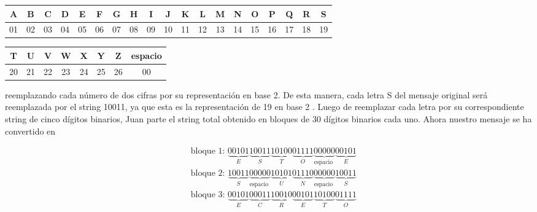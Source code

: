\documentclass[10pt]{article}
\begin{document}
\begin{center}
\begin{tabular}{|c|c|c|c|c|c|c|c|c|c|c|c|c|c|c|c|c|c|c|}
\hline
A & B & C & D & E & F & G & H & I & J & K & L & M & N & O & P & Q & R & S \\
\hline
01 & 02 & 03 & 04 & 05 & 06 & 07 & 08 & 09 & 10 & 11 & 12 & 13 & 14 & 15 & 16 & 17 & 18 & 19 \\
\hline
\end{tabular}
\end{center}

\begin{center}
\begin{tabular}{|c|c|c|c|c|c|c|c|}
\hline
T & U & V & W & X & Y & Z & espacio \\
\hline
20 & 21 & 22 & 23 & 24 & 25 & 26 & 00 \\
\hline
\end{tabular}
\end{center}

reemplazando cada número de dos cifras por su representación en base 2. De esta manera, cada letra S del mensaje original será reemplazada por el string 10011, ya que esta es la representación de 19 en base 2 . Luego de reemplazar cada letra por su correspondiente string de cinco dígitos binarios, Juan parte el string total obtenido en bloques de 30 dígitos binarios cada uno. Ahora nuestro mensaje se ha convertido en

$$
\begin{aligned}
& \text { bloque 1: } \underbrace{00101}_{E} \underbrace{10011}_{S} \underbrace{10100}_{T} \underbrace{01111}_{O} \underbrace{00000}_{\text {espacio }} \underbrace{00101}_{E} \\
& \text { bloque 2: } \underbrace{10011}_{S} \underbrace{00000}_{\text {espacio }} \underbrace{10101}_{U} \underbrace{01110}_{N} \underbrace{00000}_{\text {espacio }} \underbrace{10011}_{S} \\
& \text { bloque 3: } \underbrace{00101}_{E} \underbrace{00011}_{C} \underbrace{10010}_{R} \underbrace{00101}_{E} \underbrace{10100}_{T} \underbrace{01111}_{O}
\end{aligned}
$$
\end{document}
